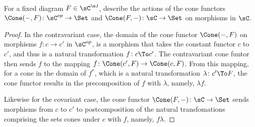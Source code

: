 \documentclass[../../main]{subfiles}
\begin{document}
\paragraph{}
\begin{exercise}
For a fixed diagram $F \in \sC^\sJ$, describe the actions of the cone functors $
\Cone(-,F)\colon \sC^{op} \rightarrow \Set$ and $ \Cone(F,-)\colon \sC
\rightarrow \Set$ on morphisms in $\sC$.
\end{exercise}

\begin{proof}
In the contravariant case, the domain of the cone functor $ \Cone(-,F)$
on morphisms $f\colon c \rightarrow c'$ in $\sC^{op}$, is a morphism that takes the
constant functor $c$ to $c'$, and thus is a natural transformation $f\colon c
\To c'$. The contravariant cone funtor then sends $f$ to the mapping
$f\colon \Cone(c',F)\rightarrow \Cone(c,F)$. From this mapping, for a cone
in the domain of $f^*$, which is a natural transformation $\lambda\colon c' \To
F$, the cone functor results in the precomposition of $f$ with $\lambda$,
namely, $\lambda f$.

Likewise for the covariant case, the cone functor $ \Cone(F,-)\colon \sC
\rightarrow \Set$ sends morphisms from $c$ to $c'$ to postcomposition of
the natural transfomations comprising the sets cones under $c$ with $f$,
namely, $f\lambda$.

\end{proof}
\end{document}
